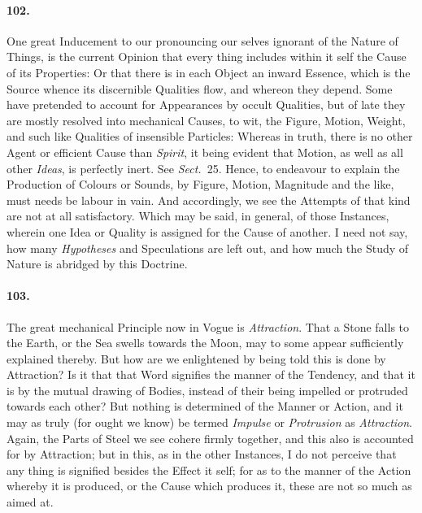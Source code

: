 \documentclass[]{article}
\newenvironment{sectionbody}{\begin{multicols}{2}}{\end{multicols}}
\begin{document}
\begin{sectionbody}
\paragraph{102.} One great Inducement to our pronouncing our selves ignorant of
the Nature of Things, is the current Opinion that every thing
includes within it self the Cause of its Properties: Or that
there is in each Object an inward Essence, which is the Source
whence its discernible Qualities flow, and whereon they depend.
Some have pretended to account for Appearances by occult
Qualities, but of late they are mostly resolved into mechanical
Causes, to wit, the Figure, Motion, Weight, and such like
Qualities of insensible Particles: Whereas in truth, there is no
other Agent or efficient Cause than \emph{Spirit}, it being
evident that Motion, as well as all other \emph{Ideas}, is
perfectly inert.  See \emph{Sect.}~25.
Hence, to endeavour to explain the Production of Colours or
Sounds, by Figure, Motion, Magnitude and the like, must needs be
labour in vain.  And accordingly, we see the Attempts of that
kind are not at all satisfactory.  Which may be said, in general,
of those Instances, wherein one Idea or Quality is assigned for
the Cause of another.  I need not say, how many
\emph{Hypotheses} and Speculations are left out, and how much
the Study of Nature is abridged by this Doctrine.



\paragraph{103.} The great mechanical Principle now in Vogue is
\emph{Attraction}.  That a Stone falls to the Earth, or the Sea
swells towards the Moon, may to some appear sufficiently
explained thereby.  But how are we enlightened by being told this
is done by Attraction? Is it that that Word signifies the manner
of the Tendency, and that it is by the mutual drawing of Bodies,
instead of their being impelled or protruded towards each other?
But nothing is determined of the Manner or Action, and it may as
truly (for ought we know) be termed \emph{Impulse} or
\emph{Protrusion} as \emph{Attraction}.  Again, the Parts of
Steel we see cohere firmly together, and this also is accounted
for by Attraction; but in this, as in the other Instances, I do
not perceive that any thing is signified besides the Effect it
self; for as to the manner of the Action whereby it is produced,
or the Cause which produces it, these are not so much as aimed
at.




\end{sectionbody}
\end{document}
